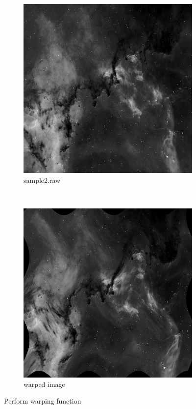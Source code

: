 \documentclass{article}
\begin{document}
\begin{enumerate}[label=(\alph*)]
    \begin{figure}[!htb]
        \centering
        \begin{subfigure}[b]{0.3\textwidth}
            \includegraphics[width=\textwidth]{img/C.png}
            \caption{sample2.raw}
        \end{subfigure}
        ~
        \begin{subfigure}[b]{0.3\textwidth}
            \includegraphics[width=\textwidth]{img/D.png}
            \caption{warped image}
        \end{subfigure}
        \caption{Perform warping function}
    \end{figure}
\end{enumerate}
\end{document}
